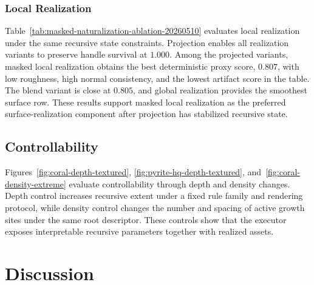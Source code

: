 \documentclass[acmtog,anonymous,review]{acmart}
\begin{document}
\begin{table}[t]
  \centering
  \scriptsize
  \setlength{\tabcolsep}{2pt}
  \caption{Projection ablation over four task families and three deterministic seeds.}
  \label{tab:projection-ablation}
  \resizebox{\columnwidth}{!}{%
  
  }
\end{table}
\subsubsection{Local Realization}
\label{sec:masked-local-realization}
\begin{table}[t]
  \centering
  \scriptsize
  \setlength{\tabcolsep}{2pt}
  \caption{Local realization ablation over four task families and three seeds.}
  \label{tab:masked-naturalization-ablation-20260510}
  \resizebox{0.88\columnwidth}{!}{%
  
  }
\end{table}
Table~\ref{tab:masked-naturalization-ablation-20260510} evaluates local realization under the same recursive state constraints. Projection enables all realization variants to preserve handle survival at $1.000$. Among the projected variants, masked local realization obtains the best deterministic proxy score, $0.807$, with low roughness, high normal consistency, and the lowest artifact score in the table. The blend variant is close at $0.805$, and global realization provides the smoothest surface row. These results support masked local realization as the preferred surface-realization component after projection has stabilized recursive state.



\subsection{Controllability}
Figures~\ref{fig:coral-depth-textured}, \ref{fig:pyrite-hq-depth-textured}, and~\ref{fig:coral-density-extreme} evaluate controllability through depth and density changes. Depth control increases recursive extent under a fixed rule family and rendering protocol, while density control changes the number and spacing of active growth sites under the same root descriptor. These controls show that the executor exposes interpretable recursive parameters together with realized assets.

\section{Discussion}
\end{document}
